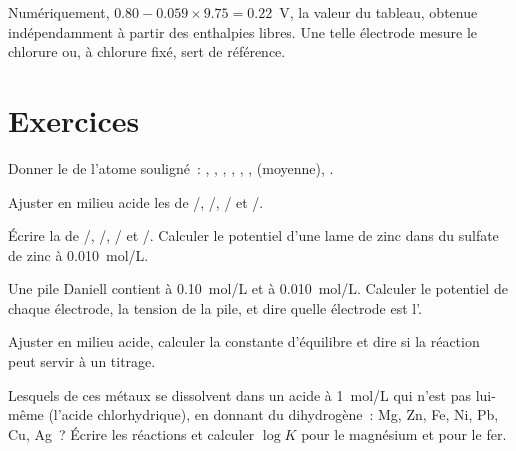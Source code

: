 Numériquement, $0.80 - 0.059 \times 9.75 = 0.22$~V, la valeur du
tableau, obtenue indépendamment à partir des enthalpies libres. Une
telle électrode mesure le chlorure ou, à chlorure fixé, sert de
référence.

\section{Exercices}

\begin{exercise}[$\star$]\label{exo:b1:nernst:1}
Donner le  de l'atome souligné~: ,
, , ,
, , 
(moyenne), .
\end{exercise}

\begin{exercise}[$\star$]\label{exo:b1:nernst:2}
Ajuster en milieu acide les  de /,
/, / et /.
\end{exercise}

\begin{exercise}[$\star$]\label{exo:b1:nernst:3}
Écrire la  de /, /,
/ et /. Calculer le potentiel d'une lame
de zinc dans du sulfate de zinc à \qty{0.010}{mol/L}.
\end{exercise}

\begin{exercise}[$\star$]\label{exo:b1:nernst:4}
Une pile Daniell contient  à \qty{0.10}{mol/L} et  à
\qty{0.010}{mol/L}. Calculer le potentiel de chaque électrode, la
tension de la pile, et dire quelle électrode est l'.
\end{exercise}

\begin{exercise}[$\star\star$]\label{exo:b1:nernst:5}
Ajuster  en milieu acide, calculer la constante
d'équilibre et dire si la réaction peut servir à un titrage.
\end{exercise}

\begin{exercise}[$\star\star$]\label{exo:b1:nernst:6}
Lesquels de ces métaux se dissolvent dans un acide à \qty{1}{mol/L} qui
n'est pas lui-même  (l'acide chlorhydrique), en donnant du
dihydrogène~: Mg, Zn, Fe, Ni, Pb, Cu, Ag~? Écrire les réactions et
calculer $\log K$ pour le magnésium et pour le fer.
\end{exercise}

